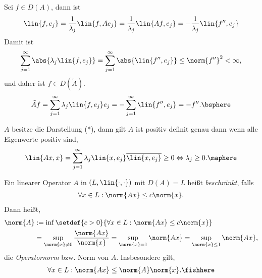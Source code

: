 \begin{bsp}
\begin{enumerate}[label=\arabic{*}.)]
Sei $f\in D(A)$, dann ist
\begin{align*}
\lin{f,e_j} = \frac{1}{\lambda_j} \lin{f,Ae_j} =
\frac{1}{\lambda_j}\lin{Af,e_j} = -\frac{1}{\lambda_j}\lin{f'',e_j}  
\end{align*}
Damit ist
\begin{align*}
\sum\limits_{j=1}^\infty \abs{\lambda_j \lin{f,e_j}} = \sum\limits_{j=1}^\infty
\abs{\lin{f'',e_j}} \le \norm{f''}^2 < \infty,
\end{align*}
und daher ist $f\in D(\tilde{A})$.
\begin{align*}
\tilde{A}f = \sum\limits_{j=1}^\infty \lambda_j \lin{f,e_j}e_j = -
\sum\limits_{j=1}^\infty \lin{f'',e_j} = -f''.\bsphere
\end{align*}
\end{enumerate}
\end{bsp}

\begin{bem}
\label{bem:1.19}
$A$ besitze die Darstellung (*), dann gilt $A$ ist positiv definit genau dann
wenn alle Eigenwerte positiv sind,
\begin{align*}
\lin{Ax,x} = \sum\limits_{j=1}^\infty \lambda_j
\lin{x,e_j}\overline{\lin{x,e_j}} \ge 0 \Leftrightarrow \lambda_j \ge 0.\maphere
\end{align*}
\end{bem}

\begin{defn}
\label{defn:1.20}
Ein linearer Operator $A$ in $(L,\lin{\cdot,\cdot})$ mit $D(A)=L$ heißt
\emph{beschränkt}, falls
\begin{align*}
\forall x\in L: \norm{Ax} \le c\norm{x}.
\end{align*}
Dann heißt,
\begin{align*}
\norm{A}&:= \inf\setdef{c> 0}{\forall x\in L: \norm{Ax}\le c\norm{x}}\\
&= \sup\limits_{\norm{x}\neq 0}\frac{\norm{Ax}}{\norm{x}} =
\sup\limits_{\norm{x}=1}\norm{Ax} = \sup\limits_{\norm{x}\le 1} \norm{Ax},
\end{align*}
die \emph{Operatornorm} bzw. Norm von $A$. Insbesondere gilt,
\begin{align*}
\forall x\in L: \norm{Ax}\le\norm{A}\norm{x}.\fishhere
\end{align*}
\end{defn}

